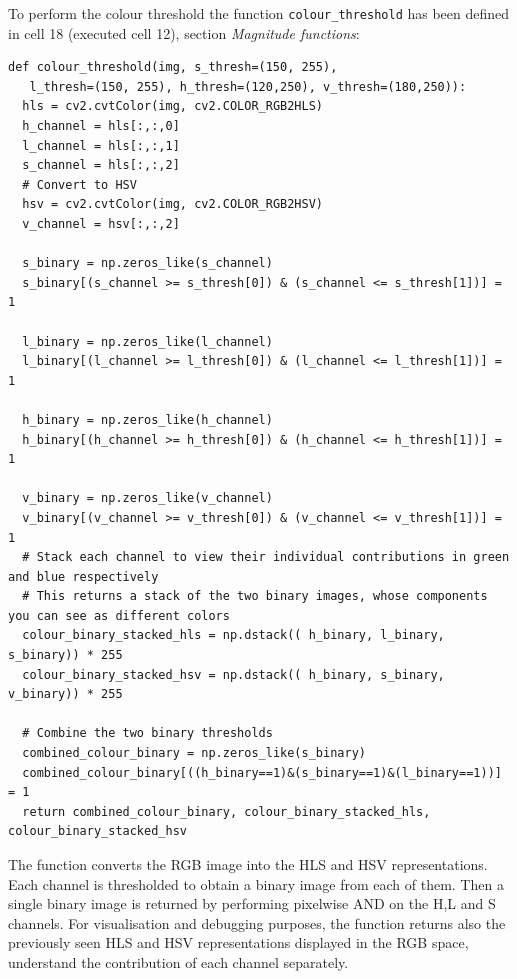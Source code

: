 \documentclass{article}
\let\cd\lstinline
\begin{document}
To perform the colour threshold the function \cd+colour_threshold+ has been defined in cell 18 (executed cell 12), section \textit{Magnitude functions}:
\begin{lstlisting}
def colour_threshold(img, s_thresh=(150, 255),
   l_thresh=(150, 255), h_thresh=(120,250), v_thresh=(180,250)):
  hls = cv2.cvtColor(img, cv2.COLOR_RGB2HLS)
  h_channel = hls[:,:,0]
  l_channel = hls[:,:,1]
  s_channel = hls[:,:,2]
  # Convert to HSV
  hsv = cv2.cvtColor(img, cv2.COLOR_RGB2HSV)
  v_channel = hsv[:,:,2]

  s_binary = np.zeros_like(s_channel)
  s_binary[(s_channel >= s_thresh[0]) & (s_channel <= s_thresh[1])] = 1
    
  l_binary = np.zeros_like(l_channel)
  l_binary[(l_channel >= l_thresh[0]) & (l_channel <= l_thresh[1])] = 1

  h_binary = np.zeros_like(h_channel)
  h_binary[(h_channel >= h_thresh[0]) & (h_channel <= h_thresh[1])] = 1
    
  v_binary = np.zeros_like(v_channel)
  v_binary[(v_channel >= v_thresh[0]) & (v_channel <= v_thresh[1])] = 1
  # Stack each channel to view their individual contributions in green and blue respectively
  # This returns a stack of the two binary images, whose components you can see as different colors
  colour_binary_stacked_hls = np.dstack(( h_binary, l_binary, s_binary)) * 255
  colour_binary_stacked_hsv = np.dstack(( h_binary, s_binary, v_binary)) * 255

  # Combine the two binary thresholds
  combined_colour_binary = np.zeros_like(s_binary)
  combined_colour_binary[((h_binary==1)&(s_binary==1)&(l_binary==1))] = 1
  return combined_colour_binary, colour_binary_stacked_hls, colour_binary_stacked_hsv
\end{lstlisting}
The function converts the RGB image into the HLS and HSV representations. Each channel is thresholded to obtain a binary image from each of them. Then a single binary image is returned by performing pixelwise AND on the H,L and S channels. For visualisation and debugging purposes, the function returns also the previously seen HLS and HSV representations displayed in the RGB space, understand the contribution of each channel separately.
\end{document}
